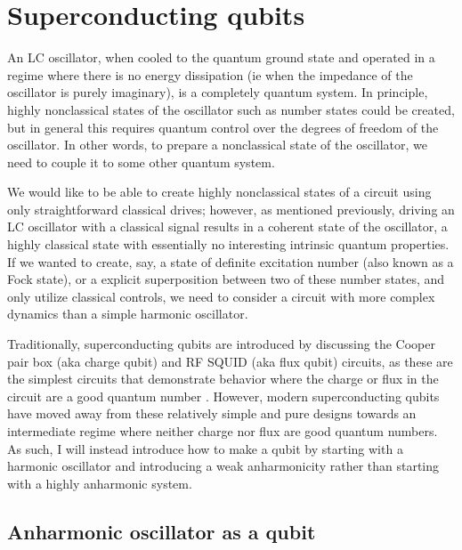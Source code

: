 \section{Superconducting qubits}

An LC oscillator, when cooled to the quantum ground state and operated in a regime where there is no energy dissipation (ie when the impedance of the oscillator is purely imaginary), is a completely quantum system.  In principle, highly nonclassical states of the oscillator such as number states could be created,  but in general this requires quantum control over the degrees of freedom of the oscillator.  In other words, to prepare a nonclassical state of the oscillator, we need to couple it to some other quantum system.

We would like to be able to create highly nonclassical states of a circuit using only straightforward classical drives; however, as mentioned previously, driving an LC oscillator with a classical signal results in a coherent state of the oscillator, a highly classical state with essentially no interesting intrinsic quantum properties.  If we wanted to create, say, a state of definite excitation number (also known as a Fock state), or a explicit superposition between two of these number states, and only utilize classical controls, we need to consider a circuit with more complex dynamics than a simple harmonic oscillator.

Traditionally, superconducting qubits are introduced by discussing the Cooper pair box (aka charge qubit) and RF SQUID (aka flux qubit) circuits, as these are the simplest circuits that demonstrate behavior where the charge or flux in the circuit are a good quantum number \cite{scqubitsrev2008}.  However, modern superconducting qubits have moved away from these relatively simple and pure designs towards an intermediate regime where neither charge nor flux are good quantum numbers.  As such, I will instead introduce how to make a qubit by starting with a harmonic oscillator and introducing a weak anharmonicity rather than starting with a highly anharmonic system.

\subsection{Anharmonic oscillator as a qubit}

